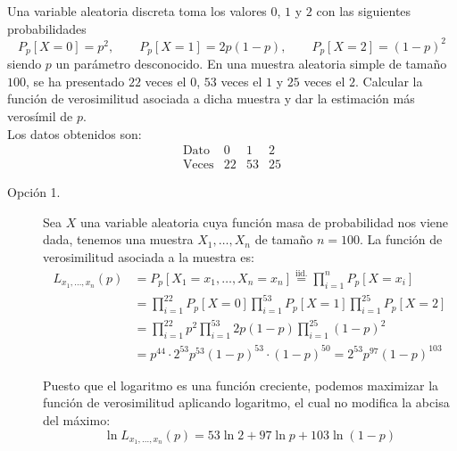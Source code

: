 \begin{ejercicio}
    Una variable aleatoria discreta toma los valores $0$, $1$ y $2$ con las siguientes probabilidades
    \begin{equation*}
        P_p[X=0] = p^2, \qquad P_p[X=1] = 2p(1-p), \qquad P_p[X=2] = {(1-p)}^{2}
    \end{equation*}
    siendo $p$ un parámetro desconocido. En una muestra aleatoria simple de tamaño $100$, se ha presentado $22$ veces el $0$, $53$ veces el $1$ y $25$ veces el $2$. Calcular la función de verosimilitud asociada a dicha muestra y dar la estimación más verosímil de $p$.\\

    Los datos obtenidos son:
    \begin{equation*}
        \begin{array}{c|ccc}
            \text{Dato} & 0 & 1 & 2 \\
            \hline
            \text{Veces} & 22 & 53 & 25
        \end{array}
    \end{equation*}
    
    \begin{description}
        \item[Opción 1.] Sea $X$ una variable aleatoria cuya función masa de probabilidad nos viene dada, tenemos una muestra $X_1, \ldots, X_n$ de tamaño $n=100$. La función de verosimilitud asociada a la muestra es:
        \begin{align*}
            L_{x_1,\ldots,x_n}(p) &= P_p[X_1=x_1, \ldots, X_n = x_n] \stackrel{\text{iid.}}{=}\prod_{i=1}^{n}P_p[X=x_i]\\ 
                                &= \prod_{i=1}^{22}P_p[X=0] \prod_{i=1}^{53}P_p[X=1]\prod_{i=1}^{25}P_p[X=2] \\
                                &= \prod_{i=1}^{22}p^2 \prod_{i=1}^{53}2p(1-p)\prod_{i=1}^{25}{(1-p)}^{2} \\
                                &= p^{44} \cdot 2^{53}p^{53}{(1-p)}^{53} \cdot {(1-p)}^{50} = 2^{53}p^{97}{(1-p)}^{103}
        \end{align*}
        
        Puesto que el logaritmo es una función creciente, podemos maximizar la función de verosimilitud aplicando logaritmo, el cual no modifica la abcisa del máximo:
        \begin{equation*}
            \ln L_{x_1,\ldots,x_n}(p) = 53\ln 2 + 97 \ln p + 103 \ln(1-p)
        \end{equation*}
        

\end{description}
\end{ejercicio}
